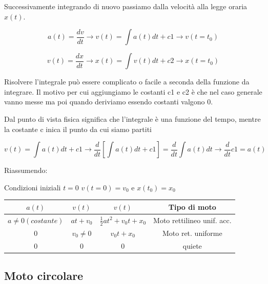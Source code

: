 Successivamente integrando di nuovo passiamo dalla velocità alla 
legge oraria $x(t)$.

\begin{equation}
    a(t)=\frac{dv}{dt} \rightarrow v(t)= \int {a(t) dt} +c1 \rightarrow v(t=t_0)
\end{equation}

\begin{equation}
    v(t)=\frac{dx}{dt} \rightarrow x(t)= \int {v(t)dt} +c2 \rightarrow x(t=t_0)
\end{equation}


 Risolvere l'integrale può essere complicato o facile a seconda della funzione
 da integrare.
Il motivo per cui aggiungiamo le costanti c1 e c2 è
che nel caso generale vanno messe ma poi quando deriviamo 
essendo costanti valgono $0$.

Dal punto di vista fisica significa che l'integrale è una
funzione del tempo, mentre la costante c inica il punto da cui siamo
partiti

\begin{equation}
   v(t)= \int {a(t)dt} +c1 \rightarrow 
   \frac{d}{dt}[\int{a(t)dt}+c1]=
   \frac{d}{dt}\int{a(t)dt}\rightarrow \frac{d}{dt}c1=a(t)
\end{equation}

Riassumendo:

Condizioni iniziali $t=0$
$v(t=0)=v_0$ e $x(t_0)=x_0$

\begin{center}
    \begin{tabular}{ |c|c|c|c| } 
     \hline
     $a(t)$ & $v(t)$ & $v(t)$ & Tipo di moto \\ 
     \hline
        $a\neq 0 (costante)$ & $at+v_0$ & $\frac{1}{2}at^2+v_0t+x_0$ & Moto rettilineo unif. acc. \\ 
     $0$ & $v_0 \neq 0$ & $v_0t+x_0$ & Moto ret. uniforme \\ 
     $0$ & $0$ & $0$ & quiete \\
     \hline
    \end{tabular}
\end{center}

\subsection{Moto circolare} %